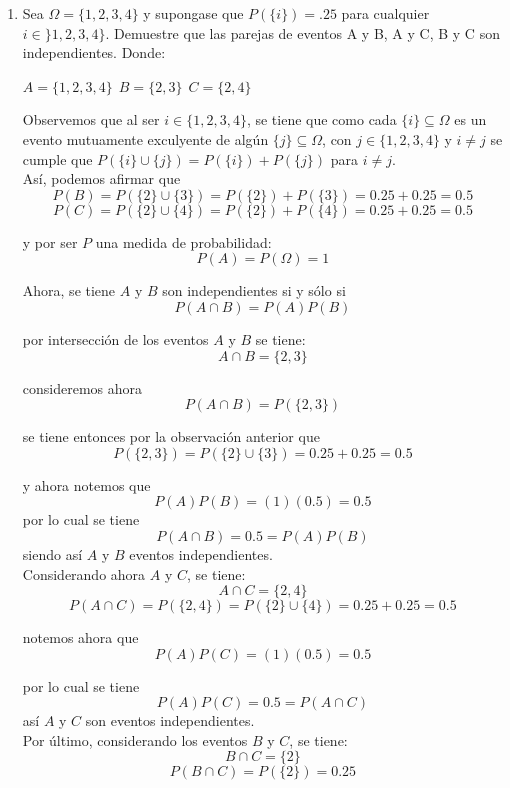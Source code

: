 \documentclass[12pt,a4paper]{report}
\begin{document}
\begin{enumerate}
   \item {
    Sea $\Omega = \lbrace 1,2,3,4 \rbrace$ y supongase que $P(\lbrace i \rbrace)=.25$ para cualquier $i\in \rbrace 1,2,3,4 \rbrace$. Demuestre que las parejas de eventos A y B, A y C, B y C son independientes. Donde:\\
    \begin{center}
    $A=\lbrace 1,2,3,4 \rbrace \ \ B=\lbrace 2,3 \rbrace \ \ C= \lbrace 2,4 \rbrace $
	\end{center}

		Observemos que al ser $i \in \{1,2,3,4\}$, se tiene que como cada $ \{i\} \subseteq \Omega$
		es un evento mutuamente exculyente de algún $\{ j \} \subseteq \Omega$, con
		$j \in \{1,2,3,4\}$ y $ i \neq j$ se cumple que $ P(\{i\} \cup \{j\}) = P(\{i\}) + P(\{j\}) $
		para $i \neq j$.\\

		Así, podemos afirmar que
			$$ P(B) = P(\{ 2 \} \cup \{ 3 \} ) = P(\{2\}) + P(\{3\}) = 0.25 + 0.25 = 0.5 $$
			$$ P(C) = P(\{ 2 \} \cup \{ 4 \} ) = P(\{2\}) + P(\{4\}) = 0.25 + 0.25 = 0.5 $$

		y por ser $P$ una medida de probabilidad:
			$$ P(A) = P(\Omega) = 1 $$

		Ahora, se tiene $A$ y $B$ son independientes si y sólo si
			$$ P(A \cap B) = P(A)P(B) $$

		por intersección de los eventos $A$ y $B$ se tiene:
			$$ A \cap B = \{ 2,3 \}$$

		consideremos ahora
			$$ P( A \cap B ) = P(\{ 2,3 \})$$

		se tiene entonces por la observación anterior que
			$$ P(\{ 2,3 \}) = P(\{ 2 \} \cup \{ 3 \} ) = 0.25 + 0.25 = 0.5$$

		y ahora notemos que
			$$ P(A)P(B) = (1)(0.5) = 0.5 $$
		por lo cual se tiene
			$$ P(A \cap B) = 0.5 = P(A)P(B) $$
		siendo así $A$ y $B$ eventos independientes.\\

		Considerando ahora $A$ y $C$, se tiene:
			$$ A \cap C = \{ 2,4 \}$$
			$$ P( A \cap C ) = P(\{ 2,4 \}) = P(\{ 2 \} \cup \{ 4 \} ) = 0.25 + 0.25 = 0.5 $$

		notemos ahora que
			$$ P(A)P(C) = (1)(0.5) = 0.5 $$

		por lo cual se tiene
			$$ P(A)P(C) = 0.5 = P( A \cap C ) $$
		así $A$ y $C$ son eventos independientes.\\

		Por último, considerando los eventos $B$ y $C$, se tiene:
			$$ B \cap C = \{ 2 \}$$
			$$ P( B \cap C ) = P(\{ 2 \}) = 0.25 $$

}
\end{enumerate}
\end{document}
